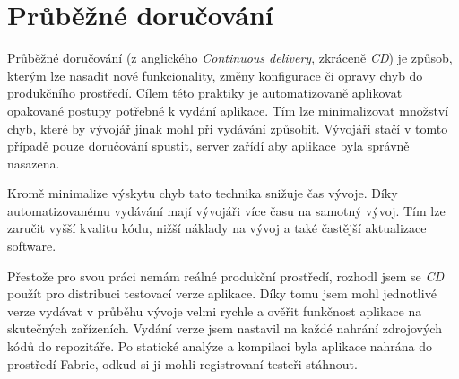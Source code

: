 \section{Průběžné doručování}

Průběžné doručování (z anglického \textit{Continuous delivery}, zkráceně \textit{CD}) je způsob, kterým lze nasadit nové funkcionality, změny konfigurace či opravy chyb do produkčního prostředí.
Cílem této praktiky je automatizovaně aplikovat opakované postupy potřebné k vydání aplikace.
Tím lze minimalizovat množství chyb, které by vývojář jinak mohl při vydávání způsobit.
Vývojáři stačí v tomto případě pouze doručování spustit, server zařídí aby aplikace byla správně nasazena.

Kromě minimalize výskytu chyb tato technika snižuje čas vývoje.
Díky automatizovanému vydávání mají vývojáři více času na samotný vývoj.
Tím lze zaručit vyšší kvalitu kódu, nižší náklady na vývoj a také častější aktualizace software. \cite{continuousdelivery-what-is-ci}

Přestože pro svou práci nemám reálné produkční prostředí, rozhodl jsem se \textit{CD} použít pro distribuci testovací verze aplikace.
Díky tomu jsem mohl jednotlivé verze vydávat v průběhu vývoje velmi rychle a ověřit funkčnost aplikace na skutečných zařízeních.
Vydání verze jsem nastavil na každé nahrání zdrojových kódů do repozitáře.
Po statické analýze a kompilaci byla aplikace nahrána do prostředí Fabric, odkud si ji mohli registrovaní testeři stáhnout.